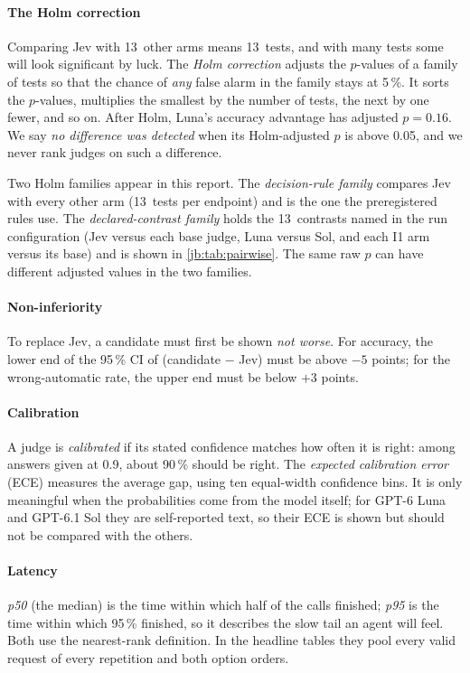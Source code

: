 \documentclass[11pt,letterpaper]{article}
\newcommand{\term}[1]{\emph{#1}}
\newcommand{\HoldPairwiseFamily}{13}
\newcommand{\LunaHoldRAccPHolm}{0.16}
\newcommand{\NIAccMarginPts}{5}
\newcommand{\NIWaMarginPts}{3}
\newcommand{\RuleOneFamilyHold}{13}
\begin{document}
\paragraph{The Holm correction} Comparing Jev with \RuleOneFamilyHold\ other arms means
\RuleOneFamilyHold\ tests, and with many tests some will look significant by luck. The
\term{Holm correction} adjusts the $p$-values of a family of tests so that the chance of \emph{any}
false alarm in the family stays at 5\,\%. It sorts the $p$-values, multiplies the smallest by the number
of tests, the next by one fewer, and so on. After Holm, Luna's accuracy advantage has adjusted
$p = \LunaHoldRAccPHolm$. We say \term{no difference was detected} when its Holm-adjusted $p$ is above
0.05, and we never rank judges on such a difference.

Two Holm families appear in this report. The \emph{decision-rule family} compares Jev with every other
arm (\RuleOneFamilyHold\ tests per endpoint) and is the one the preregistered rules use. The
\emph{declared-contrast family} holds the \HoldPairwiseFamily\ contrasts named in the run configuration
(Jev versus each base judge, Luna versus Sol, and each I1 arm versus its base) and is shown in
\cref{jb:tab:pairwise}. The same raw $p$ can have different adjusted values in the two families.

\paragraph{Non-inferiority} To replace Jev, a candidate must first be shown \emph{not worse}. For
accuracy, the lower end of the 95\,\% CI of (candidate $-$ Jev) must be above $-\NIAccMarginPts$ points;
for the wrong-automatic rate, the upper end must be below $+\NIWaMarginPts$ points.

\paragraph{Calibration} A judge is \term{calibrated} if its stated confidence matches how often it is
right: among answers given at 0.9, about 90\,\% should be right. The \term{expected calibration error}
(ECE) measures the average gap, using ten equal-width confidence bins. It is only meaningful when the
probabilities come from the model itself; for GPT-6 Luna and GPT-6.1 Sol they are self-reported text,
so their ECE is shown but should not be compared with the others.

\paragraph{Latency} \term{p50} (the median) is the time within which half of the calls finished;
\term{p95} is the time within which 95\,\% finished, so it describes the slow tail an agent will feel.
Both use the nearest-rank definition. In the headline tables they pool every valid request of every
repetition and both option orders.
\end{document}
